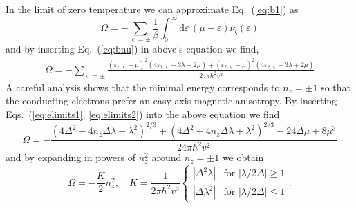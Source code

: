 In the limit of zero temperature we can approximate Eq.~(\ref{eq:b1}) as
\begin{equation}
    \Omega = {-}\sum_{\varsigma=\pm}\frac{1}{\beta}\int_0^\infty \mathrm{d}\varepsilon\,(\mu-\varepsilon)\nu_\varsigma(\varepsilon)
    \label{eq:newomega}
\end{equation}
and by inserting Eq.~(\ref{eq:bnu}) in above's equation we find, 
\begin{multline}
    \Omega = -\sum_{\varsigma=\pm}\frac{(\varepsilon_{1,\varsigma}-\mu)^2(4\varepsilon_{1,\varsigma}-3\lambda+2\mu)+(\varepsilon_{2,\varsigma}-\mu)^2(4\varepsilon_{2,\varsigma}+3\lambda+2\mu)}{24\pi\hbar^2v^2}
\end{multline}
A careful analysis shows that the minimal energy corresponds to $n_z=\pm1$ so that the conducting electrons prefer an easy-axis magnetic anisotropy. By inserting Eqs.~(\ref{eq:elimits1}, \ref{eq:elimits2}) into the above equation we find
\begin{equation}
	\Omega = -\frac{(4\Delta^2-4n_z \Delta\lambda+\lambda^2)^{2/3}+(4\Delta^2+4n_z \Delta\lambda+\lambda^2)^{2/3}-24\Delta\mu+8\mu^3}{24\pi\hbar^2v^2}
\end{equation}
and by expanding in powers of $n_z^2$ around $n_z=\pm1$ we obtain 
\begin{equation}
    \Omega = -\frac{K}{2}n_z^2, \quad K= \frac{1}{2\pi\hbar^2v^2}\begin{cases}
    |\Delta^2\lambda| & \text{for } |\lambda/2\Delta| \geq 1 \\
    |\Delta\lambda^2| & \text{for } |\lambda/2\Delta| \leq 1
    \end{cases}.
\end{equation}